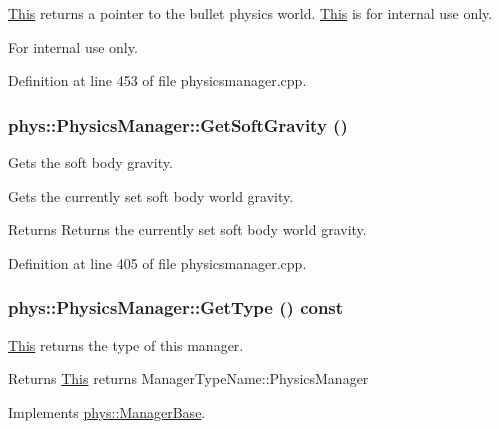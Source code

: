 \hyperlink{structThis}{This} returns a pointer to the bullet physics world. \hyperlink{structThis}{This} is for internal use only. 

\begin{DoxyInternal}{For internal use only.}
\end{DoxyInternal}


Definition at line 453 of file physicsmanager.cpp.

\hypertarget{classphys_1_1PhysicsManager_acdaad0849c3d6386e8cff5c98fc46664}{
\subsubsection[{GetSoftGravity}]{ phys::PhysicsManager::GetSoftGravity ()}}
\label{d3/dcc/classphys_1_1PhysicsManager_acdaad0849c3d6386e8cff5c98fc46664}


Gets the soft body gravity. 

Gets the currently set soft body world gravity. \begin{DoxyReturn}{Returns}
Returns the currently set soft body world gravity. 
\end{DoxyReturn}


Definition at line 405 of file physicsmanager.cpp.

\hypertarget{classphys_1_1PhysicsManager_a4d151cd24052ef3cccde6b66b8745be6}{
\subsubsection[{GetType}]{ phys::PhysicsManager::GetType () const}}
\label{d3/dcc/classphys_1_1PhysicsManager_a4d151cd24052ef3cccde6b66b8745be6}


\hyperlink{structThis}{This} returns the type of this manager. 

\begin{DoxyReturn}{Returns}
\hyperlink{structThis}{This} returns ManagerTypeName::PhysicsManager 
\end{DoxyReturn}


Implements \hyperlink{classphys_1_1ManagerBase_aff400b6599db635e24796d8221e9a0e3}{phys::ManagerBase}.



